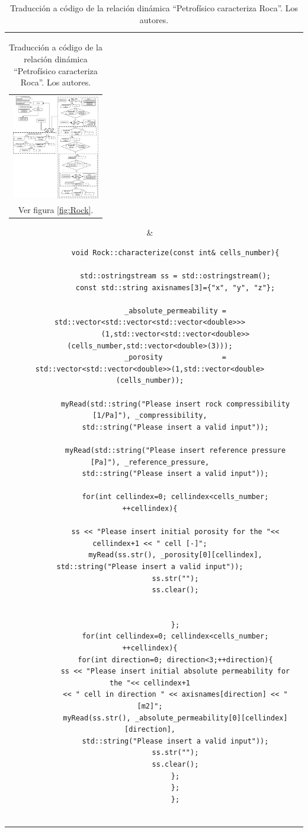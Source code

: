 \begin{table}[h!]
	\centering
	\begin{tabular}{cc}
		\parbox[c]{5em}{
			\begin{tabular}[c]{@{}c@{}}\includegraphics[width=1.5in]{Fig/Rock.pdf}\\ Ver figura \ref{fig:Rock}.\end{tabular}
		}
		&
		\begin{tiny}
			\begin{lstlisting}
			void Rock::characterize(const int& cells_number){
			
			std::ostringstream ss = std::ostringstream();
			const std::string axisnames[3]={"x", "y", "z"};
			
			_absolute_permeability = std::vector<std::vector<std::vector<double>>>
			(1,std::vector<std::vector<double>>(cells_number,std::vector<double>(3)));
			_porosity              = std::vector<std::vector<double>>(1,std::vector<double>(cells_number));
			
			myRead(std::string("Please insert rock compressibility [1/Pa]"), _compressibility,
			std::string("Please insert a valid input"));
			
			myRead(std::string("Please insert reference pressure [Pa]"), _reference_pressure,
			std::string("Please insert a valid input"));
			
			for(int cellindex=0; cellindex<cells_number; ++cellindex){
			
			ss << "Please insert initial porosity for the "<< cellindex+1 << " cell [-]";
			myRead(ss.str(), _porosity[0][cellindex], std::string("Please insert a valid input"));
			ss.str("");
			ss.clear();
			
			
			};
			for(int cellindex=0; cellindex<cells_number; ++cellindex){
			for(int direction=0; direction<3;++direction){
			ss << "Please insert initial absolute permeability for the "<< cellindex+1
			<< " cell in direction " << axisnames[direction] << " [m2]";
			myRead(ss.str(), _absolute_permeability[0][cellindex][direction],
			std::string("Please insert a valid input"));
			ss.str("");
			ss.clear();
			};
			};
			};
			
			\end{lstlisting}
		\end{tiny}
	\end{tabular}
	\caption[Traducción a código de la relación dinámica ``Petrofísico caracteriza Roca''.]{Traducción a código de la relación dinámica ``Petrofísico caracteriza Roca''. Los autores. \label{tab:RockCharacterizeCode}}
\end{table}
\newpage

